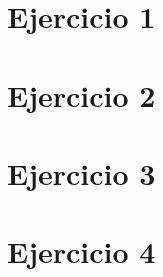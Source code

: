 \documentclass[hidelinks,a4paper,12pt, nofootinbib]{article}
\begin{document}
\maketitle

\tableofcontents
\newpage


\section{Ejercicio 1}

\newpage

\section{Ejercicio 2}

\newpage

\section{Ejercicio 3}

\newpage
\section{Ejercicio 4}

\end{document}

